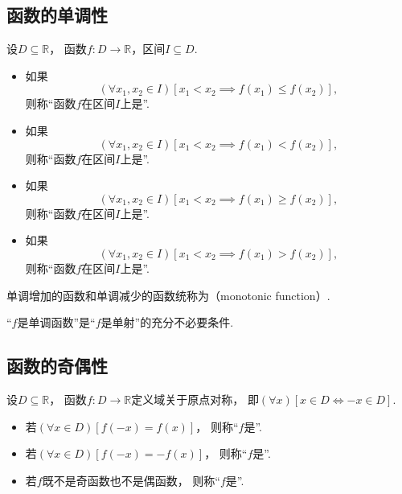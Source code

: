 \subsection{函数的单调性}
\begin{definition}
设\(D\subseteq\mathbb{R}\)，
函数\(f\colon D\to\mathbb{R}\)，区间\(I \subseteq D\).
\begin{itemize}
	\item 如果\[
		(\forall x_1,x_2\in I)
		[x_1 < x_2 \implies f(x_1) \leq f(x_2)],
	\]
	则称“函数\(f\)在区间\(I\)上是”.

	\item 如果\[
		(\forall x_1,x_2\in I)
		[x_1 < x_2 \implies f(x_1) < f(x_2)],
	\]
	则称“函数\(f\)在区间\(I\)上是”.

	\item 如果\[
		(\forall x_1,x_2\in I)
		[x_1 < x_2 \implies f(x_1) \geq f(x_2)],
	\]
	则称“函数\(f\)在区间\(I\)上是”.

	\item 如果\[
		(\forall x_1,x_2\in I)
		[x_1 < x_2 \implies f(x_1) > f(x_2)],
	\]
	则称“函数\(f\)在区间\(I\)上是”.
\end{itemize}

单调增加的函数和单调减少的函数统称为（monotonic function）.
\end{definition}

\begin{proposition}
“\(f\)是单调函数”是“\(f\)是单射”的充分不必要条件.
\end{proposition}

\subsection{函数的奇偶性}
\begin{definition}
设\(D\subseteq\mathbb{R}\)，
函数\(f\colon D\to\mathbb{R}\)定义域关于原点对称，
即\((\forall x)[x \in D \iff -x \in D]\).
\begin{itemize}
	\item 若\((\forall x \in D)
	[f(-x) = f(x)]\)，
	则称“\(f\)是”.

	\item 若\((\forall x \in D)
	[f(-x) = -f(x)]\)，
	则称“\(f\)是”.

	\item 若\(f\)既不是奇函数也不是偶函数，
	则称“\(f\)是”.
\end{itemize}
\end{definition}

